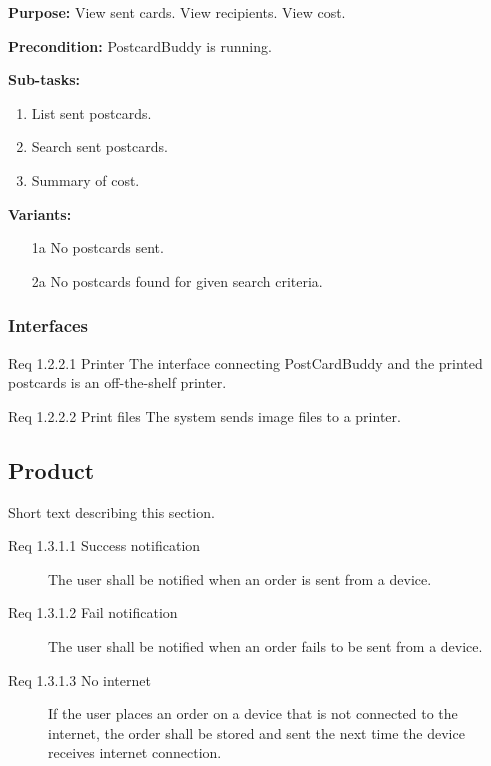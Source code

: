 \documentclass[10pt,a4paper]{article}
\begin{document}
\begin {description}
\begin {description}
\item \textbf{Purpose:} View sent cards. View recipients. View cost.
\item \textbf{Precondition:} PostcardBuddy is running. 

\item \textbf{Sub-tasks:}
\begin{enumerate}
\item List sent postcards. 
\item Search sent postcards.
\item Summary of cost.  

\end{enumerate}
\item \textbf{Variants:}
\begin{itemize}[label={}]

\item[1a] No postcards sent. 
\item[2a] No postcards found for given search criteria. 

\end{itemize}
\end{description}
\end{description}



\subsubsection{Interfaces}
\begin {description}
\item [Req 1.2.2.1 Printer] The interface connecting PostCardBuddy and the printed postcards is an off-the-shelf printer.
\item [Req 1.2.2.2 Print files] The system sends image files to a printer. 
\end{description}

\subsection{Product}
Short text describing this section.

\begin{description}
\item [Req 1.3.1.1 Success notification] The user shall be notified when an order is sent from a device.
\item [Req 1.3.1.2 Fail notification] The user shall be notified when an order fails to be sent from a device.

\item [Req 1.3.1.3 No internet] If the user places an order on a device that is not connected to the internet, the order shall be stored and sent the next time the device receives internet connection. 

\end{description}
\end{document}

